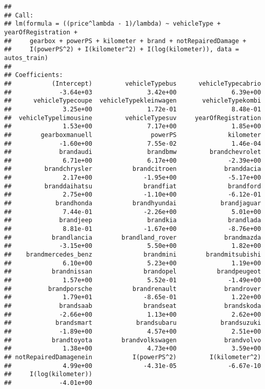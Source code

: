\documentclass[]{article}
\begin{document}
\begin{verbatim}
## 
## Call:
## lm(formula = ((price^lambda - 1)/lambda) ~ vehicleType + yearOfRegistration + 
##     gearbox + powerPS + kilometer + brand + notRepairedDamage + 
##     I(powerPS^2) + I(kilometer^2) + I(log(kilometer)), data = autos_train)
## 
## Coefficients:
##           (Intercept)         vehicleTypebus      vehicleTypecabrio  
##             -3.64e+03               3.42e+00               6.39e+00  
##      vehicleTypecoupe  vehicleTypekleinwagen       vehicleTypekombi  
##              3.25e+00               1.72e-01               8.48e-01  
##  vehicleTypelimousine         vehicleTypesuv     yearOfRegistration  
##              1.53e+00               7.17e+00               1.85e+00  
##        gearboxmanuell                powerPS              kilometer  
##             -1.60e+00               7.55e-02               1.46e-04  
##             brandaudi               brandbmw         brandchevrolet  
##              6.71e+00               6.17e+00              -2.39e+00  
##         brandchrysler           brandcitroen             branddacia  
##              2.17e+00              -1.95e+00              -5.17e+00  
##         branddaihatsu              brandfiat              brandford  
##              2.75e+00              -1.10e+00              -6.12e-01  
##            brandhonda           brandhyundai            brandjaguar  
##              7.44e-01              -2.26e+00               5.01e+00  
##             brandjeep               brandkia              brandlada  
##              8.81e-01              -1.67e+00              -8.76e+00  
##           brandlancia        brandland_rover             brandmazda  
##             -3.15e+00               5.50e+00               1.82e+00  
##    brandmercedes_benz              brandmini        brandmitsubishi  
##              6.10e+00               5.23e+00               1.19e+00  
##           brandnissan              brandopel           brandpeugeot  
##              1.57e+00               5.52e-01              -1.49e+00  
##          brandporsche           brandrenault             brandrover  
##              1.79e+01              -8.65e-01               1.22e+00  
##             brandsaab              brandseat             brandskoda  
##             -2.66e+00               1.13e+00               2.62e+00  
##            brandsmart            brandsubaru            brandsuzuki  
##             -1.89e+00               4.57e+00               2.51e+00  
##           brandtoyota        brandvolkswagen             brandvolvo  
##              1.38e+00               4.73e+00               3.59e+00  
## notRepairedDamagenein           I(powerPS^2)         I(kilometer^2)  
##              4.99e+00              -4.31e-05              -6.67e-10  
##     I(log(kilometer))  
##             -4.01e+00
\end{verbatim}
\end{document}
